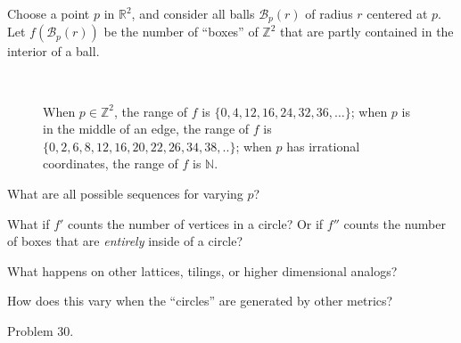 \documentclass{article}
\begin{document}
Choose a point $p$ in $\mathbb{R}^2$, and consider all balls $\mathcal B_p(r)$
of radius $r$ centered at $p$. Let $f(\mathcal B_p(r))$ be the number of ``boxes'' of
$\mathbb{Z}^2$ that are partly contained in the interior of a ball.
\begin{figure}[ht!]
  \centering
  ~
  \caption{
    When $p \in \mathbb{Z}^2$, the range of $f$ is $\{0,4,12,16,24,32,36,\dots\}$;
    when $p$ is in the middle of an edge, the range of $f$ is $\{0,2,6,8,12,16,20,22,26,34,38,..\}$;
    when $p$ has irrational coordinates, the range of $f$ is $\mathbb N$.
  }
\end{figure}

\begin{question}
  What are all possible sequences for varying $p$?
\end{question}

\begin{related}
  \item What if $f'$ counts the number of vertices in a circle?
    Or if $f''$ counts the number of boxes that are \textit{entirely} inside
    of a circle?
  \item What happens on other lattices, tilings, or higher dimensional analogs?
  \item How does this vary when the ``circles'' are generated by other metrics?
\end{related}

\begin{references}
  \item Problem 30.
\end{references}
\end{document}
